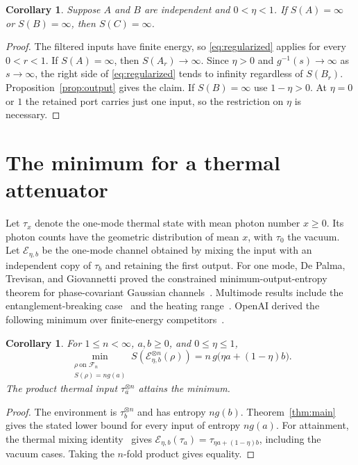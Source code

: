 \documentclass[11pt,letterpaper]{article}
\newtheorem{corollary}[theorem]{Corollary}
\numberwithin{equation}{section}
\newcommand{\Fock}{\mathcal F_n}
\begin{document}
\begin{corollary}\label{cor:infinite}
Suppose $A$ and $B$ are independent and $0<\eta<1$. If $S(A)=\infty$
or $S(B)=\infty$, then $S(C)=\infty$.
\end{corollary}

\begin{proof}
The filtered inputs have finite energy, so \eqref{eq:regularized}
applies for every $0<r<1$. If $S(A)=\infty$, then $S(A_r)\to\infty$.
Since $\eta>0$ and
$g^{-1}(s)\to\infty$ as $s\to\infty$, the right side of
\eqref{eq:regularized} tends to infinity regardless of $S(B_r)$.
Proposition~\ref{prop:output} gives the claim. If $S(B)=\infty$ use
$1-\eta>0$. At $\eta=0$ or $1$ the retained port carries just one
input, so the restriction on $\eta$ is necessary.
\end{proof}

\section{The minimum for a thermal attenuator}

Let $\tau_x$ denote the one-mode thermal state with mean photon number
$x\ge0$. Its photon counts have the geometric distribution of mean $x$,
with $\tau_0$ the vacuum. Let $\mathcal E_{\eta,b}$ be the one-mode
channel obtained by mixing the input with an independent copy of
$\tau_b$ and retaining the first output. For one mode, De Palma,
Trevisan, and Giovannetti proved the constrained minimum-output-entropy
theorem for phase-covariant Gaussian channels~\cite{dtg}. Multimode
results include the entanglement-breaking case~\cite{depalma} and
the heating range~\cite{bm}. OpenAI derived the following minimum over
finite-energy competitors~\cite[Corollary~1.2]{oai}.

\begin{corollary}\label{cor:thermal}
For $1\le n<\infty$, $a,b\ge0$, and $0\le\eta\le1$,
\[
 \min_{\substack{\rho\ \text{on }\Fock\\ S(\rho)=n g(a)}}
 S\!\left(\mathcal E_{\eta,b}^{\otimes n}(\rho)\right)
 = n\,g\bigl(\eta a+(1-\eta)b\bigr).
\]
The product thermal input $\tau_a^{\otimes n}$ attains the minimum.
\end{corollary}

\begin{proof}
The environment is $\tau_b^{\otimes n}$ and has entropy $n g(b)$.
Theorem~\ref{thm:main} gives the stated lower bound for every input
of entropy $n g(a)$. For attainment, the thermal mixing
identity~\cite[Proposition~2.3]{oai} gives
$\mathcal E_{\eta,b}(\tau_a)=\tau_{\eta a+(1-\eta)b}$, including
the vacuum cases. Taking the $n$-fold product gives equality.
\end{proof}
\end{document}
